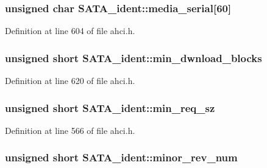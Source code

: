 \subsubsection[{\texorpdfstring{media\+\_\+serial}{media_serial}}]{\setlength{\rightskip}{0pt plus 5cm}unsigned char S\+A\+T\+A\+\_\+ident\+::media\+\_\+serial\mbox{[}60\mbox{]}}\hypertarget{structSATA__ident_a20fa3859f2745ac5a2f32cb5d5a6ed62}{}\label{structSATA__ident_a20fa3859f2745ac5a2f32cb5d5a6ed62}


Definition at line 604 of file ahci.\+h.

\subsubsection[{\texorpdfstring{min\+\_\+dwnload\+\_\+blocks}{min_dwnload_blocks}}]{\setlength{\rightskip}{0pt plus 5cm}unsigned short S\+A\+T\+A\+\_\+ident\+::min\+\_\+dwnload\+\_\+blocks}\hypertarget{structSATA__ident_aad38263481e1b39593f8a381a072b170}{}\label{structSATA__ident_aad38263481e1b39593f8a381a072b170}


Definition at line 620 of file ahci.\+h.

\subsubsection[{\texorpdfstring{min\+\_\+req\+\_\+sz}{min_req_sz}}]{\setlength{\rightskip}{0pt plus 5cm}unsigned short S\+A\+T\+A\+\_\+ident\+::min\+\_\+req\+\_\+sz}\hypertarget{structSATA__ident_adbb9bf7c54a82fb330df2fd2bc58ded9}{}\label{structSATA__ident_adbb9bf7c54a82fb330df2fd2bc58ded9}


Definition at line 566 of file ahci.\+h.

\subsubsection[{\texorpdfstring{minor\+\_\+rev\+\_\+num}{minor_rev_num}}]{\setlength{\rightskip}{0pt plus 5cm}unsigned short S\+A\+T\+A\+\_\+ident\+::minor\+\_\+rev\+\_\+num}\hypertarget{structSATA__ident_a43a70eb59b8388d13f79d3b02b0a7c51}{}\label{structSATA__ident_a43a70eb59b8388d13f79d3b02b0a7c51}


